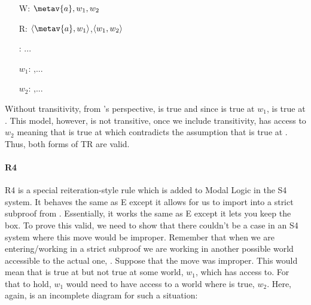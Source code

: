 \begin{center}
\end{center}
\begin{itemize}
\item[W:] $\metav{a},w_1,w_2$
\item[R:]$\openntuple \metav{a},w_1\closentuple$,$\langle w_1,w_2\rangle$  
\item[\metav{a}:] ... 
\item[$w_1$:] \enot{},...
\item[$w_2$:] ,...
\end{itemize}

Without transitivity, from 's perspective, \enot\ediamond{} is true and since \ediamond{} is true at $w_1$, \ediamond\ediamond{} is true at . This model, however, is not transitive, once we include transitivity,  has access to $w_2$ meaning that \ediamond{} is true at  which contradicts the assumption that \enot\ediamond{} is true at . Thus, both forms of TR are valid.  

\paragraph{R4}
R4 is a special reiteration-style rule which is added to Modal Logic in the S4 system. It behaves the same as \ebox E except it allows for us to import \ebox{} into a strict subproof from \ebox{}. Essentially, it works the same as \ebox E except it lets you keep the box. To prove this valid, we need to show that there couldn't be a case in an S4 system where this move would be improper. Remember that when we are entering/working in a strict subproof we are working in another possible world accessible to the actual one, . Suppose that the move was improper. This would mean that \ebox{} is true at  but not true at some world, $w_1$, which  has access to. For that to hold, $w_1$ would need to have access to a world where \enot{} is true, $w_2$. Here, again, is an incomplete diagram for such a situation: 

